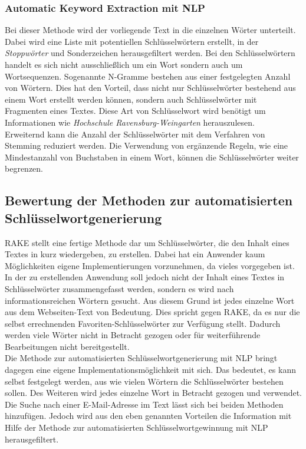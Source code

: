 		\subsubsection{Automatic Keyword Extraction mit NLP}
			\label{sec:Automatic Keyword Extraction}
			Bei dieser Methode wird der vorliegende Text in die einzelnen Wörter unterteilt. Dabei wird eine Liste mit potentiellen Schlüsselwörtern erstellt, in der \textit{Stoppwörter} und Sonderzeichen herausgefiltert werden. Bei den Schlüsselwörtern handelt es sich nicht ausschließlich um ein Wort sondern auch um Wortsequenzen. Sogenannte N-Gramme bestehen aus einer festgelegten Anzahl von Wörtern. Dies hat den Vorteil, dass nicht nur Schlüsselwörter bestehend aus einem Wort erstellt werden können, sondern auch Schlüsselwörter mit Fragmenten eines Textes. Diese Art von Schlüsselwort wird benötigt um Informationen wie \textit{Hochschule Ravensburg-Weingarten} herauszulesen.\\
			Erweiternd kann die Anzahl der Schlüsselwörter mit dem Verfahren von Stemming reduziert werden. Die Verwendung von ergänzende Regeln, wie eine Mindestanzahl von Buchstaben in einem Wort, können die Schlüsselwörter weiter begrenzen.
		
	\subsection{Bewertung der Methoden zur automatisierten Schlüsselwortgenerierung}
		RAKE stellt eine fertige Methode dar um Schlüsselwörter, die den Inhalt eines Textes in kurz wiedergeben, zu erstellen. Dabei hat ein Anwender kaum Möglichkeiten eigene Implementierungen vorzunehmen, da vieles vorgegeben ist. In der zu erstellenden Anwendung soll jedoch nicht der Inhalt eines Textes in Schlüsselwörter zusammengefasst werden, sondern es wird nach informationsreichen Wörtern gesucht. Aus diesem Grund ist jedes einzelne Wort aus dem Webseiten-Text von Bedeutung. Dies spricht gegen RAKE, da es nur die selbst errechnenden Favoriten-Schlüsselwörter zur Verfügung stellt. Dadurch werden viele Wörter nicht in Betracht gezogen oder für weiterführende Bearbeitungen nicht bereitgestellt.\\
		Die Methode zur automatisierten Schlüsselwortgenerierung mit NLP bringt dagegen eine eigene Implementationsmöglichkeit mit sich. Das bedeutet, es kann selbst festgelegt werden, aus wie vielen Wörtern die Schlüsselwörter bestehen sollen. Des Weiteren wird jedes einzelne Wort in Betracht gezogen und verwendet.\\ Die Suche nach einer E-Mail-Adresse im Text lässt sich bei beiden Methoden hinzufügen. Jedoch wird aus den eben genannten Vorteilen die Information mit Hilfe der Methode zur automatisierten Schlüsselwortgewinnung mit NLP herausgefiltert.
		
